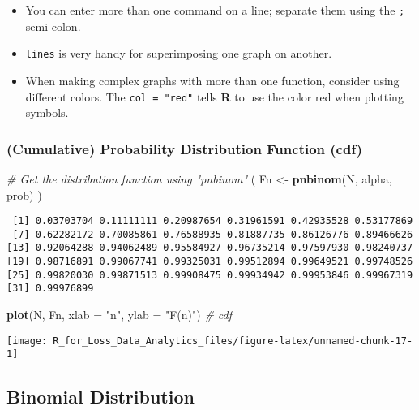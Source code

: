 \documentclass[]{book}
\newenvironment{Shaded}{\begin{snugshade}}{\end{snugshade}}
\newcommand{\KeywordTok}[1]{\textcolor[rgb]{0.13,0.29,0.53}{\textbf{#1}}}
\newcommand{\DataTypeTok}[1]{\textcolor[rgb]{0.13,0.29,0.53}{#1}}
\newcommand{\StringTok}[1]{\textcolor[rgb]{0.31,0.60,0.02}{#1}}
\newcommand{\CommentTok}[1]{\textcolor[rgb]{0.56,0.35,0.01}{\textit{#1}}}
\newcommand{\NormalTok}[1]{#1}
\providecommand{\tightlist}{%
  \setlength{\itemsep}{0pt}\setlength{\parskip}{0pt}}
\theoremstyle{definition}
\theoremstyle{definition}
\theoremstyle{definition}
\theoremstyle{remark}
\begin{document}
\begin{itemize}
\tightlist
\item
  You can enter more than one command on a line; separate them using the
  \texttt{;} semi-colon.
\item
  \texttt{lines} is very handy for superimposing one graph on another.
\item
  When making complex graphs with more than one function, consider using
  different colors. The \texttt{col\ =\ "red"} tells \textbf{R} to use
  the color red when plotting symbols.
\end{itemize}

\subsubsection{(Cumulative) Probability Distribution Function
(cdf)}\label{cumulative-probability-distribution-function-cdf-1}

\begin{Shaded}
\begin{Highlighting}[]
\CommentTok{# Get the distribution function using "pnbinom"}
\NormalTok{( Fn <-}\StringTok{ }\KeywordTok{pnbinom}\NormalTok{(N, alpha, prob) )}
\end{Highlighting}
\end{Shaded}

\begin{verbatim}
 [1] 0.03703704 0.11111111 0.20987654 0.31961591 0.42935528 0.53177869
 [7] 0.62282172 0.70085861 0.76588935 0.81887735 0.86126776 0.89466626
[13] 0.92064288 0.94062489 0.95584927 0.96735214 0.97597930 0.98240737
[19] 0.98716891 0.99067741 0.99325031 0.99512894 0.99649521 0.99748526
[25] 0.99820030 0.99871513 0.99908475 0.99934942 0.99953846 0.99967319
[31] 0.99976899
\end{verbatim}

\begin{Shaded}
\begin{Highlighting}[]
\KeywordTok{plot}\NormalTok{(N, Fn, }\DataTypeTok{xlab =} \StringTok{"n"}\NormalTok{, }\DataTypeTok{ylab =} \StringTok{"F(n)"}\NormalTok{)  }\CommentTok{# cdf}
\end{Highlighting}
\end{Shaded}

\begin{center}\texttt{[image: R\_for\_Loss\_Data\_Analytics\_files/figure-latex/unnamed-chunk-17-1]} \end{center}

\subsection{Binomial Distribution}\label{binomial-distribution}
\end{document}
